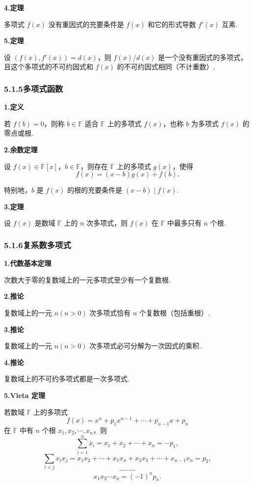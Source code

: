 \documentclass[UTF8, 12pt, fontset=fandol, oneside]{ctexart}
\begin{document}
\noindent\textbf{4.\quad 定理}

多项式 $f(x)$ 没有重因式的充要条件是 $f(x)$ 和它的形式导数 $f'(x)$ 互素.

\noindent\textbf{5.\quad 定理}

设 $(f(x),f'(x))=d(x)$，则 $f(x)/d(x)$ 是一个没有重因式的多项式，且这个多项式的不可约因式和 $f(x)$ 的不可约因式相同（不计重数）.

\subsubsection*{5.1.5\quad 多项式函数}

\noindent\textbf{1.\quad 定义}

若 $f(b)=0$，则称 $b\in\mathbb{F}$ 适合 $\mathbb{F}$ 上的多项式 $f(x)$，也称 $b$ 为多项式 $f(x)$ 的零点或根.

\noindent\textbf{2.\quad 余数定理}

设 $f(x)\in\mathbb{F}[x]$，$b\in\mathbb{F}$，则存在 $\mathbb{F}$ 上的多项式 $g(x)$，使得
\[
f(x)=(x-b)g(x)+f(b).
\]

特别地，$b$ 是 $f(x)$ 的根的充要条件是 $(x-b)\mid f(x)$.

\noindent\textbf{3.\quad 定理}

设 $f(x)$ 是数域 $\mathbb{F}$ 上的 $n$ 次多项式，则 $f(x)$ 在 $\mathbb{F}$ 中最多只有 $n$ 个根.

\subsubsection*{5.1.6\quad 复系数多项式}

\noindent\textbf{1.\quad 代数基本定理}

次数大于零的复数域上的一元多项式至少有一个复数根.

\noindent\textbf{2.\quad 推论}

复数域上的一元 $n(n>0)$ 次多项式恰有 $n$ 个复数根（包括重根）.

\noindent\textbf{3.\quad 推论}

复数域上的一元 $n(n>0)$ 次多项式必可分解为一次因式的乘积.

\noindent\textbf{4.\quad 推论}

复数域上的不可约多项式都是一次多项式.

\noindent\textbf{5.\quad Vieta 定理}

若数域 $\mathbb{F}$ 上的多项式
\[
f(x)=x^n+p_1x^{n-1}+\cdots+p_{n-1}x+p_n
\]
在 $\mathbb{F}$ 中有 $n$ 个根 $x_1,x_2,\cdots,x_n$，则
\[
\sum_{i=1}^n x_i=x_1+x_2+\cdots+x_n=-p_1,
\]
\[
\sum_{i<j}x_ix_j=x_1x_2+\cdots+x_1x_n+x_2x_3+\cdots+x_{n-1}x_n=p_2,
\]
\[
\cdots\cdots\cdots
\]
\[
x_1x_2\cdots x_n=(-1)^n p_n.
\]
\end{document}
